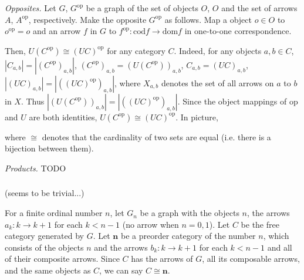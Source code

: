 \documentclass[luatex]{article}
\begin{document}
\showArt

\textit{Opposites.} Let $G$, $G^\mathrm{op}$ be a graph of the set of objects $O$, $O$ and the set of arrows $A$, $A^\mathrm{op}$, respectively. Make the opposite $G^\mathrm{op}$ as follows. Map a object $o \in O$ to $o^\mathrm{op} = o$ and an arrow $f$ in $G$ to $f^\mathrm{op} : \mathrm{cod} f \rightarrow \mathrm{dom} f$ in one-to-one correspondence.

Then, $U(C^\mathrm{op}) \cong (UC)^\mathrm{op}$ for any category $C$. Indeed, for any objects $a, b \in C$, $|C_{a, b}| = |(C^\mathrm{op})_{a, b}|$, $(C^\mathrm{op})_{a, b} = (U(C^\mathrm{op}))_{a, b}$, $C_{a, b} = (UC)_{a, b}$, $|(UC)_{a, b}| = |((UC)^\mathrm{op})_{a, b}|$, where $X_{a, b}$ denotes the set of all arrows on $a$ to $b$ in $X$. Thus $|(U(C^\mathrm{op}))_{a, b}| = |((UC)^\mathrm{op})_{a, b}|$. Since the object mappings of $\mathrm{op}$ and $U$ are both identities, $U(C^\mathrm{op}) \cong (UC)^\mathrm{op}$. In picture, 

\begin{center}
\end{center}

where $\cong$ denotes that the cardinality of two sets are equal (i.e. there is a bijection between them).

\textit{Products.} TODO

\subsubsection{}

\showArt

(seems to be trivial...)

For a finite ordinal number $n$, let $G_n$ be a graph with the objects $n$, the arrows $a_k : k \rightarrow k + 1$ for each $k < n - 1$ (no arrow when $n = 0, 1$). Let $C$ be the free category generated by $G$. Let $\mathbf{n}$ be a preorder category of the number $n$, which consists of the objects $n$ and the arrows $b_k : k \rightarrow k + 1$ for each $k < n - 1$ and all of their composite arrows. Since $C$ has the arrows of $G$, all its composable arrows, and the same objects as $C$, we can say $C \cong \mathbf{n}$.
\end{document}
